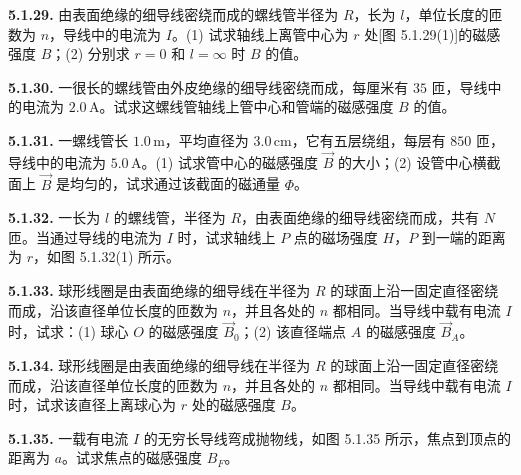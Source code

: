 \begin{center}
\end{center}

\vfill
\newpage

\textbf{5.1.29.} 由表面绝缘的细导线密绕而成的螺线管半径为 $R$，长为 $l$，单位长度的匝数为 $n$，导线中的电流为 $I$。(1) 试求轴线上离管中心为 $r$ 处[图 5.1.29(1)]的磁感强度 $B$；(2) 分别求 $r=0$ 和 $l=\infty$ 时 $B$ 的值。

\begin{center}
\end{center}

\vfill
\newpage

\textbf{5.1.30.} 一很长的螺线管由外皮绝缘的细导线密绕而成，每厘米有 $35$ 匝，导线中的电流为 $2.0\,\mathrm{A}$。试求这螺线管轴线上管中心和管端的磁感强度 $B$ 的值。

\vfill
\newpage

\textbf{5.1.31.} 一螺线管长 $1.0\,\mathrm{m}$，平均直径为 $3.0\,\mathrm{cm}$，它有五层绕组，每层有 $850$ 匝，导线中的电流为 $5.0\,\mathrm{A}$。(1) 试求管中心的磁感强度 $\vec{B}$ 的大小；(2) 设管中心横截面上 $\vec{B}$ 是均匀的，试求通过该截面的磁通量 $\Phi$。

\vfill
\newpage

\textbf{5.1.32.} 一长为 $l$ 的螺线管，半径为 $R$，由表面绝缘的细导线密绕而成，共有 $N$ 匝。当通过导线的电流为 $I$ 时，试求轴线上 $P$ 点的磁场强度 $H$，$P$ 到一端的距离为 $r$，如图 5.1.32(1) 所示。

\begin{center}
\end{center}

\vfill
\newpage

\textbf{5.1.33.} 球形线圈是由表面绝缘的细导线在半径为 $R$ 的球面上沿一固定直径密绕而成，沿该直径单位长度的匝数为 $n$，并且各处的 $n$ 都相同。当导线中载有电流 $I$ 时，试求：(1) 球心 $O$ 的磁感强度 $\vec{B}_0$；(2) 该直径端点 $A$ 的磁感强度 $\vec{B}_A$。

\vfill
\newpage

\textbf{5.1.34.} 球形线圈是由表面绝缘的细导线在半径为 $R$ 的球面上沿一固定直径密绕而成，沿该直径单位长度的匝数为 $n$，并且各处的 $n$ 都相同。当导线中载有电流 $I$ 时，试求该直径上离球心为 $r$ 处的磁感强度 $B$。

\vfill
\newpage

\textbf{5.1.35.} 一载有电流 $I$ 的无穷长导线弯成抛物线，如图 5.1.35 所示，焦点到顶点的距离为 $a$。试求焦点的磁感强度 $B_{F}$。

